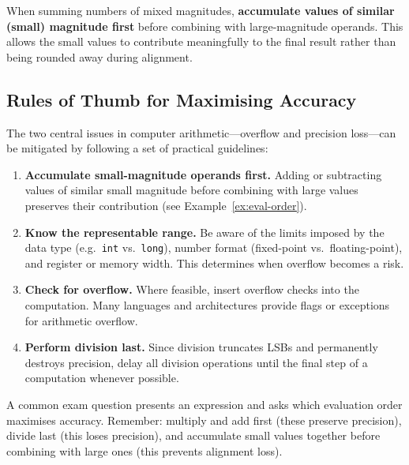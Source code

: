 \documentclass[11pt, a4paper, notitlepage]{report}
\theoremstyle{definition}
\theoremstyle{remark}
\theoremstyle{definition}
\begin{document}
\begin{keyresult}[title={Key Result: Evaluation Order for Accuracy}]
  When summing numbers of mixed magnitudes, \textbf{accumulate values of similar (small) magnitude first} before combining with large-magnitude operands. This allows the small values to contribute meaningfully to the final result rather than being rounded away during alignment.
\end{keyresult}

\subsection{Rules of Thumb for Maximising Accuracy}
\label{sec:accuracy-rules}

The two central issues in computer arithmetic---overflow and precision loss---can be mitigated by following a set of practical guidelines:

\begin{enumerate}[leftmargin=2em]
  \item \textbf{Accumulate small-magnitude operands first.} Adding or subtracting values of similar small magnitude before combining with large values preserves their contribution (see Example~\ref{ex:eval-order}).
  \item \textbf{Know the representable range.} Be aware of the limits imposed by the data type (e.g.\ \texttt{int} vs.\ \texttt{long}), number format (fixed-point vs.\ floating-point), and register or memory width. This determines when overflow becomes a risk.
  \item \textbf{Check for overflow.} Where feasible, insert overflow checks into the computation. Many languages and architectures provide flags or exceptions for arithmetic overflow.
  \item \textbf{Perform division last.} Since division truncates LSBs and permanently destroys precision, delay all division operations until the final step of a computation whenever possible.
\end{enumerate}

\begin{examtip}[title={Exam Tip: Ordering Operations}]
  A common exam question presents an expression and asks which evaluation order maximises accuracy. Remember: multiply and add first (these preserve precision), divide last (this loses precision), and accumulate small values together before combining with large ones (this prevents alignment loss).
\end{examtip}
\end{document}
